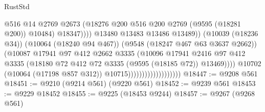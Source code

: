 \begin{lexlean}{RustStd}
\begin{coremodule}
                                                        @516
                                                        @14
                                                        @2769
                                                        @2673
                                                        (@18276
                                                          @200
                                                          @516
                                                          @200
                                                          @2769
                                                          (@9595 (@18281 @200))
                                                          @10484)
                                                        @18347))))
                                                @13480
                                                @13483
                                                @13486
                                                @13489))
                                            (@10039 (@18236 @34))
                                            (@10064 (@18240 @94 @467))
                                            (@9548 (@18247 @467 @63 @3637 @2662))
                                            (@10087
                                              @17941
                                              @97
                                              @412
                                              @2662
                                              @3335
                                              (@10096
                                                @17941
                                                @2416
                                                @97
                                                @412
                                                @3335
                                                (@18180
                                                  @72
                                                  @412
                                                  @72
                                                  @3335
                                                  (@9595 (@18185 @72))
                                                  @13469))))
                                          @10702
                                          (@10064 (@17198 @857 @312))
                                          @10715)))))))))))))))))))
@18447 := @9208 @561
@18451 := @9210 (@9214 @561) (@9220 @561)
@18452 := @9239 @561
@18453 := @9229 @18452
@18455 := @9225 (@18453 @9244)
@18457 := @9267 (@9268 @561)

\end{coremodule}
\end{lexlean}

